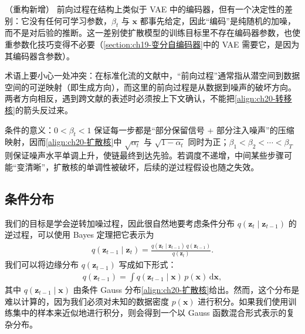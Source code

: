 \documentclass[../../main.tex]{subfiles}
\begin{document}
\begin{remark}（重构新增）
前向过程在结构上类似于 VAE 中的编码器，但有一个决定性的差别：它没有任何可学习参数，$\beta_t$ 与 $\bm{x}$ 都事先给定，因此“编码”是纯随机的加噪，而不是对后验的推断。这一差别使扩散模型的训练目标里不存在编码器参数，也使重参数化技巧变得不必要（\cref{section:ch19-变分自编码器}中的 VAE 需要它，是因为其编码器含参数）。\par
术语上要小心一处冲突：在标准化流的文献中，“前向过程”通常指从潜空间到数据空间的可逆映射（即生成方向），而这里的前向过程是从数据到噪声的破坏方向。两者方向相反，遇到跨文献的表述时必须按上下文确认，不能把\eqref{align:ch20-转移核}的箭头反过来。\par
条件的意义：$0<\beta_t<1$ 保证每一步都是“部分保留信号 + 部分注入噪声”的压缩映射，因而\eqref{align:ch20-扩散核}中 $\sqrt{\alpha_t}$ 与 $\sqrt{1-\alpha_t}$ 同时为正；$\beta_1<\beta_2<\cdots<\beta_T$ 则保证噪声水平单调上升，使链最终到达先验。若调度不递增，中间某些步骤可能“变清晰”，扩散核的单调性被破坏，后续的逆过程假设也随之失效。
\end{remark}

\subsection{条件分布}\label{subsection:ch20-条件分布}

我们的目标是学会逆转加噪过程，因此很自然地要考虑条件分布 $q(\bm{z}_t\mid\bm{z}_{t-1})$ 的逆过程，可以使用 Bayes 定理把它表示为
\begin{align}
q(\bm{z}_{t-1}\mid\bm{z}_t)=\frac{q(\bm{z}_t\mid\bm{z}_{t-1})\,q(\bm{z}_{t-1})}{q(\bm{z}_t)}.
\label{align:ch20-Bayes逆}
\end{align}
我们可以将边缘分布 $q(\bm{z}_{t-1})$ 写成如下形式：
\begin{align}
q(\bm{z}_{t-1})=\int q(\bm{z}_{t-1}\mid\bm{x})\,p(\bm{x})\,\mathrm{d}\bm{x},
\label{align:ch20-边缘z}
\end{align}
其中 $q(\bm{z}_{t-1}\mid\bm{x})$ 由条件 Gauss 分布\eqref{align:ch20-扩散核}给出。然而，这个分布是难以计算的，因为我们必须对未知的数据密度 $p(\bm{x})$ 进行积分。如果我们使用训练集中的样本来近似地进行积分，则会得到一个以 Gauss 函数混合形式表示的复杂分布。
\end{document}
